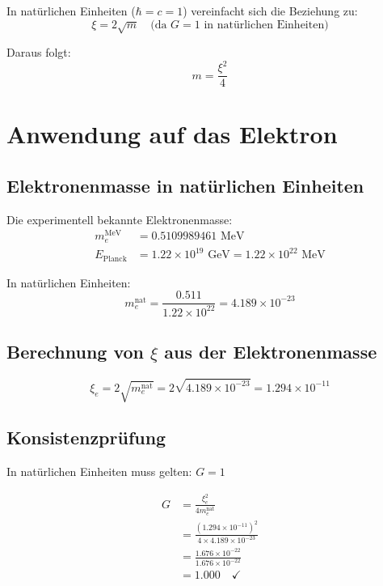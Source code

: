 \documentclass[12pt,a4paper]{article}
\theoremstyle{definition}
\begin{document}
	In natürlichen Einheiten ($\hbar = c = 1$) vereinfacht sich die Beziehung zu:
	\begin{equation}
		\xi = 2\sqrt{m} \quad \text{(da } G = 1 \text{ in natürlichen Einheiten)}
	\end{equation}
	
	Daraus folgt:
	\begin{equation}
		m = \frac{\xi^2}{4}
	\end{equation}
	
	\section{Anwendung auf das Elektron}
	
	\subsection{Elektronenmasse in natürlichen Einheiten}
	
	Die experimentell bekannte Elektronenmasse:
	\begin{align}
		m_e^{\text{MeV}} &= 0.5109989461 \text{ MeV}\\
		E_{\text{Planck}} &= 1.22 \times 10^{19} \text{ GeV} = 1.22 \times 10^{22} \text{ MeV}
	\end{align}
	
	In natürlichen Einheiten:
	\begin{equation}
		m_e^{\text{nat}} = \frac{0.511}{1.22 \times 10^{22}} = 4.189 \times 10^{-23}
	\end{equation}
	
	\subsection{Berechnung von $\xi$ aus der Elektronenmasse}
	
	\begin{equation}
		\xi_e = 2\sqrt{m_e^{\text{nat}}} = 2\sqrt{4.189 \times 10^{-23}} = 1.294 \times 10^{-11}
	\end{equation}
	
	\subsection{Konsistenzprüfung}
	
	In natürlichen Einheiten muss gelten: $G = 1$
	
	\begin{align}
		G &= \frac{\xi_e^2}{4m_e^{\text{nat}}}\\
		&= \frac{(1.294 \times 10^{-11})^2}{4 \times 4.189 \times 10^{-23}}\\
		&= \frac{1.676 \times 10^{-22}}{1.676 \times 10^{-22}}\\
		&= 1.000 \quad \checkmark
	\end{align}
	
\end{document}
